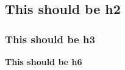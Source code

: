 
\def\mytitle{MultiMarkdown Base Header Level Test  }

\subsection{This should be h2}
\label{thisshouldbeh2}


\subsubsection{This should be h3}
\label{thisshouldbeh3}


\noindent\textbf{This should be h6}
\label{thisshouldbeh6}





